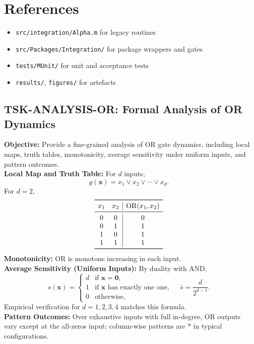 \documentclass{article}
\begin{document}
\section{References}
\begin{itemize}
\item \texttt{src/integration/Alpha.m} for legacy routines
\item \texttt{src/Packages/Integration/} for package wrappers and gates
\item \texttt{tests/MUnit/} for unit and acceptance tests
\item \texttt{results/}, \texttt{figures/} for artefacts
\end{itemize}



\subsection{TSK-ANALYSIS-OR: Formal Analysis of OR Dynamics}
\textbf{Objective:} Provide a fine-grained analysis of OR gate dynamics, including local maps, truth tables, monotonicity, average sensitivity under uniform inputs, and pattern outcomes.\\
\textbf{Local Map and Truth Table:} For \(d\) inputs,
\[
g(\mathbf{x}) = x_1 \lor x_2 \lor \cdots \lor x_d.
\]
For \(d=2\),
\[
\begin{array}{cc|c}
\toprule
 x_1 & x_2 & \mathrm{OR}(x_1,x_2) \\
\midrule
 0 & 0 & 0 \\
 0 & 1 & 1 \\
 1 & 0 & 1 \\
 1 & 1 & 1 \\
\bottomrule
\end{array}
\]
\textbf{Monotonicity:} OR is monotone increasing in each input.\\
\textbf{Average Sensitivity (Uniform Inputs):} By duality with AND,
\[
s(\mathbf{x}) = \begin{cases}
 d & \text{if } \mathbf{x}=\mathbf{0},\\
 1 & \text{if } \mathbf{x} \text{ has exactly one one},\\
 0 & \text{otherwise,}
\end{cases}\quad \bar{s} = \frac{d}{2^{d-1}}.
\]
Empirical verification for \(d=1,2,3,4\) matches this formula.\\
\textbf{Pattern Outcomes:} Over exhaustive inputs with full in-degree, OR outputs vary except at the all-zeros input; column-wise patterns are \(*\) in typical configurations.\\
\end{document}
